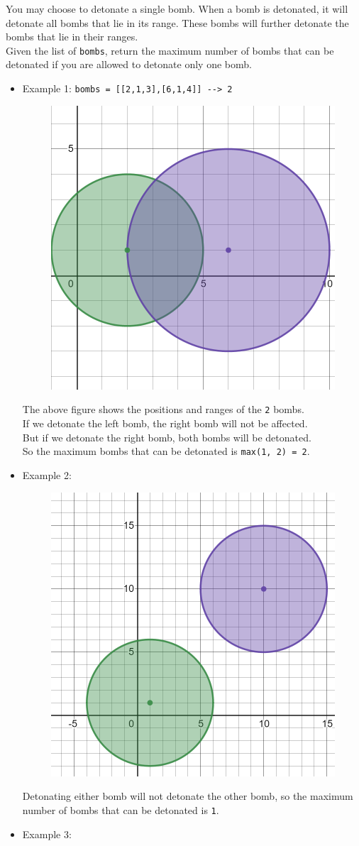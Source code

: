 You may choose to detonate a single bomb. When a bomb is detonated, it will detonate all bombs that lie in its range. These bombs will further detonate the bombs that lie in their ranges.\\

Given the list of {\colorbox{CodeBackground}{\lstinline|bombs|}}, return the maximum number of bombs that can be detonated if you are allowed to detonate only one bomb.

\begin{itemize}
\item Example 1: {\colorbox{CodeBackground}{\lstinline|bombs = [[2,1,3],[6,1,4]] --> 2|}}
\begin{figure}[H]
\centering
\includegraphics[width=0.3\linewidth]{images/lc2101_eg1}
\end{figure}
The above figure shows the positions and ranges of the {\colorbox{CodeBackground}{\lstinline|2|}} bombs.\\
If we detonate the left bomb, the right bomb will not be affected.\\
But if we detonate the right bomb, both bombs will be detonated.\\
So the maximum bombs that can be detonated is {\colorbox{CodeBackground}{\lstinline|max(1, 2) = 2|}}.
\item Example 2:
\begin{figure}[H]
\centering
\includegraphics[width=0.3\linewidth]{images/lc2101_eg2}
\end{figure}
Detonating either bomb will not detonate the other bomb, so the maximum number of bombs that can be detonated is {\colorbox{CodeBackground}{\lstinline|1|}}.
\item Example 3:

\end{itemize}

